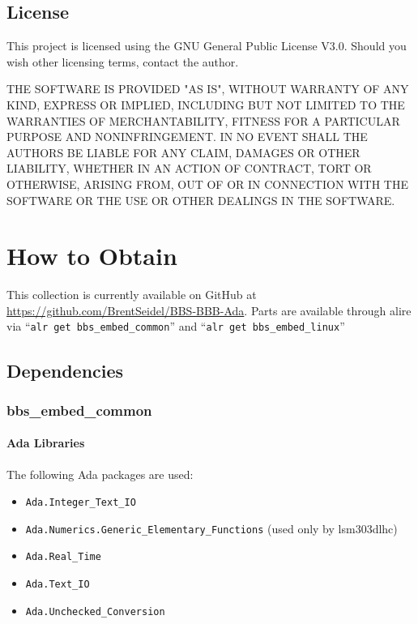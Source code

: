 \documentclass[10pt, openany]{book}
\newcommand{\package}[1]{\texttt{#1}}
\newcommand{\keyword}[1]{\texttt{#1}}
\begin{document}
\section{License}
This project is licensed using the GNU General Public License V3.0.  Should you wish other licensing terms, contact the author.

THE SOFTWARE IS PROVIDED "AS IS", WITHOUT WARRANTY OF ANY KIND, EXPRESS OR IMPLIED, INCLUDING BUT NOT LIMITED TO THE WARRANTIES OF MERCHANTABILITY, FITNESS FOR A PARTICULAR PURPOSE AND NONINFRINGEMENT. IN NO EVENT SHALL THE AUTHORS BE LIABLE FOR ANY CLAIM, DAMAGES OR OTHER LIABILITY, WHETHER IN AN ACTION OF CONTRACT, TORT OR OTHERWISE, ARISING FROM, OUT OF OR IN CONNECTION WITH THE SOFTWARE OR THE USE OR OTHER DEALINGS IN THE SOFTWARE.

\chapter{How to Obtain}

This collection is currently available on GitHub at \url{https://github.com/BrentSeidel/BBS-BBB-Ada}.  Parts are available through alire via ``\keyword{alr get bbs\_embed\_common}'' and ``\keyword{alr get bbs\_embed\_linux}''

\section{Dependencies}
\subsection{bbs\_embed\_common}
\subsubsection{Ada Libraries}
The following Ada packages are used:
\begin{itemize}
  \item \package{Ada.Integer\_Text\_IO}
  \item \package{Ada.Numerics.Generic\_Elementary\_Functions} (used only by lsm303dlhc)
  \item \package{Ada.Real\_Time}
  \item \package{Ada.Text\_IO}
  \item \package{Ada.Unchecked\_Conversion}
\end{itemize}
\end{document}
